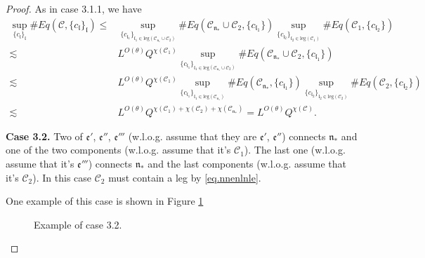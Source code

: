 \begin{proof}
As in case 3.1.1, we have
\begin{equation}
\begin{split}
    \sup_{\{c_{\mathfrak{l}}\}_{\mathfrak{l}}}\#Eq(\mathcal{C},\{c_{\mathfrak{l}}\}_{\mathfrak{l}})
    \le&
    \sup_{\{c_{\mathfrak{l}_1}\}_{\mathfrak{l}_1\in \text{leg}(\mathcal{C}_{\mathfrak{n}_*}\cup \mathcal{C}_2)} } \# Eq(\mathcal{C}_{\mathfrak{n}_*}\cup \mathcal{C}_2,\{c_{\mathfrak{l}_1}\}) \sup_{\{c_{\mathfrak{l}_2}\}_{\mathfrak{l}_2\in \text{leg}(\mathcal{C}_1)} }\# Eq(\mathcal{C}_{1}, \{c_{\mathfrak{l}_2}\})
    \\
    \lesssim&  L^{O(\theta)} Q^{\chi(\mathcal{C}_1)}\sup_{\{c_{\mathfrak{l}_1}\}_{\mathfrak{l}_1\in \text{leg}(\mathcal{C}_{\mathfrak{n}_*}\cup \mathcal{C}_2)} } \# Eq(\mathcal{C}_{\mathfrak{n}_*}\cup \mathcal{C}_2,\{c_{\mathfrak{l}_1}\})
    \\
    \lesssim&  L^{O(\theta)} Q^{\chi(\mathcal{C}_1)} \sup_{\{c_{\mathfrak{l}_1}\}_{\mathfrak{l}_1\in \text{leg}(\mathcal{C}_{\mathfrak{n}_*})} } \# Eq(\mathcal{C}_{\mathfrak{n}_*},\{c_{\mathfrak{l}_1}\}) \sup_{\{c_{\mathfrak{l}_2}\}_{\mathfrak{l}_2\in \text{leg}(\mathcal{C}_2)} }\# Eq(\mathcal{C}_{2}, \{c_{\mathfrak{l}_2}\})
    \\
    \lesssim&  L^{O(\theta)} Q^{\chi(\mathcal{C}_1)+\chi(\mathcal{C}_2)+\chi(\mathcal{C}_{\mathfrak{n}_*})}=L^{O(\theta)} Q^{\chi(\mathcal{C})}.
\end{split}
\end{equation}

\textbf{Case 3.2.} Two of  $\mathfrak{e}'$, $\mathfrak{e}''$, $\mathfrak{e}'''$ (w.l.o.g. assume that they are $\mathfrak{e}'$, $\mathfrak{e}''$) connects $\mathfrak{n}_*$ and one of the two components (w.l.o.g. assume that it's $\mathcal{C}_1$). The last one (w.l.o.g. assume that it's $\mathfrak{e}'''$) connects $\mathfrak{n}_*$ and the last components (w.l.o.g. assume that it's $\mathcal{C}_2$). In this case $\mathcal{C}_2$ must contain a leg by \eqref{eq.nnenlnle}.

One example of this case is shown in Figure \ref{fig.examplecase3.2}
\begin{figure}[H]
    \centering
    \caption{Example of case 3.2.}
    \label{fig.examplecase3.2}
\end{figure}
    

\end{proof}
